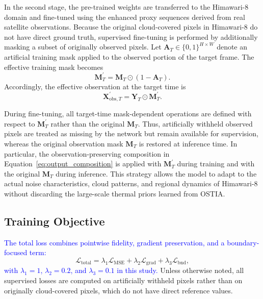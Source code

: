 \documentclass[12pt,reqno]{amsart}
\def\tb{\textcolor{blue}}
\begin{document}
In the second stage, the pre-trained weights are transferred to the Himawari-8 domain and fine-tuned using the enhanced proxy sequences derived from real satellite observations. Because the original cloud-covered pixels in Himawari-8 do not have direct ground truth, supervised fine-tuning is performed by additionally masking a subset of originally observed pixels. Let $\mathbf{A}_T\in\{0,1\}^{H\times W}$ denote an artificial training mask applied to the observed portion of the target frame. The effective training mask becomes
\begin{equation}
\mathbf{M}^{\prime}_T = \mathbf{M}_T\odot(1-\mathbf{A}_T).
\end{equation}
Accordingly, the effective observation at the target time is
\begin{equation}
\mathbf{X}^{\prime}_{\mathrm{obs},T}=\mathbf{Y}_T\odot \mathbf{M}^{\prime}_T.
\end{equation}

During fine-tuning, all target-time mask-dependent operations are defined with respect to $\mathbf{M}^{\prime}_T$ rather than the original $\mathbf{M}_T$. Thus, artificially withheld observed pixels are treated as missing by the network but remain available for supervision, whereas the original observation mask $\mathbf{M}_T$ is restored at inference time. In particular, the observation-preserving composition in Equation~\eqref{eq:output_composition} is applied with $\mathbf{M}^{\prime}_T$ during training and with the original $\mathbf{M}_T$ during inference. This strategy allows the model to adapt to the actual noise characteristics, cloud patterns, and regional dynamics of Himawari-8 without discarding the large-scale thermal priors learned from OSTIA.

\subsection{Training Objective}

\tb{The total loss combines pointwise fidelity, gradient preservation, and a
boundary-focused term:}
\begin{equation}
\mathcal{L}_{\mathrm{total}}
=
\lambda_1\mathcal{L}_{\mathrm{MSE}}
+
\lambda_2\mathcal{L}_{\mathrm{grad}}
+
\lambda_3\mathcal{L}_{\mathrm{bnd}},
\label{eq:total_loss}
\end{equation}
\tb{with $\lambda_1{=}1$, $\lambda_2{=}0.2$, and $\lambda_3{=}0.1$ in this study.}
Unless otherwise noted, all supervised losses are computed on artificially withheld pixels rather than on originally cloud-covered pixels, which do not have direct reference values.
\end{document}
